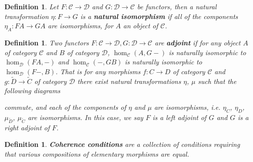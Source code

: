 \documentclass[11pt]{report}
\newcommand{\mcC}{\mathcal{C}}
\newcommand{\mcD}{\mathcal{D}}
\newtheorem{defn}[thm]{Definition} %
\begin{document}
\begin{defn}
Let $F: \mcC \to \mcD$ and $G: \mcD \to \mcC$ be functors, then a natural transformation $\eta: F \to G$ is a \textbf{natural isomorphism} if all of the components $\eta_A:FA \to GA$ are isomorphisms, for $A$ an object of $\mcC$.
\end{defn}


\begin{defn}
  Two functors $F: \mcC \to \mcD, G: \mcD \to \mcC$ are \textbf{adjoint }if for any object $A$ of category $\mcC$ and $B$ of category $\mcD$,
  $\hom_{\mcC}(A,G-)$ is naturally isomorphic to $\hom_{\mcD}(FA,-)$ and $\hom_{\mcC}(-,GB)$ is naturally isomorphic to  $\hom_{\mcD}(F-,B)$.
  That is for any morphisms $f:C \to D$ of category $\mcC$ and $g: \widetilde{D} \to \widetilde{C}$ of category $\mcD$ there exist natural transformations $\eta$, $\mu$ such that the following diagrams
  \begin{center}
  \end{center}
  \begin{center}
\end{center}
  commute, and each of the components of $\eta$ and $\mu$ are isomorphisms, i.e. $\eta_C$, $\eta_D$, $\mu_{\widetilde{D}}$, $\mu_{\widetilde{C}}$ are isomorphisms. In this case, we say $F$ is a left adjoint of $G$ and $G$ is a right adjoint of $F$.
\end{defn}
\begin{defn}
  \textbf{Coherence conditions} are a collection of conditions requiring that various compositions of elementary morphisms are equal. 
\end{defn}
\end{document}
